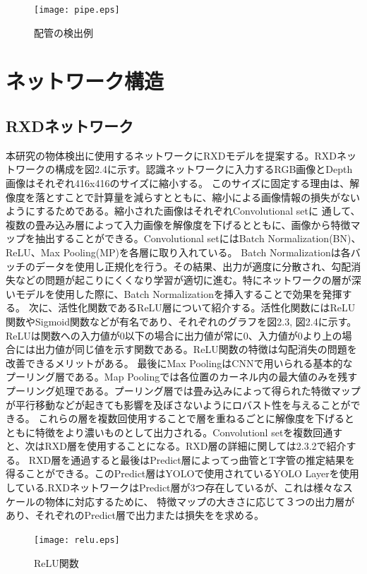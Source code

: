 \begin{figure}[htbt]
	\centering
	 \texttt{[image: pipe.eps]}
	 \caption{配管の検出例}
	 \label{fig:f2}
\end{figure}


\section{ネットワーク構造}
\subsection{RXDネットワーク}

本研究の物体検出に使用するネットワークにRXDモデルを提案する。RXDネットワークの構成を図2.4に示す。認識ネットワークに入力するRGB画像とDepth画像はそれぞれ416x416のサイズに縮小する。
このサイズに固定する理由は、解像度を落とすことで計算量を減らすとともに、縮小による画像情報の損失がないようにするためである。縮小された画像はそれぞれConvolutional setに
通して、複数の畳み込み層によって入力画像を解像度を下げるとともに、画像から特徴マップを抽出することができる。Convolutional setにはBatch Normalization(BN)、ReLU、Max Pooling(MP)を各層に取り入れている。
Batch Normalizationは各バッチのデータを使用し正規化を行う。その結果、出力が適度に分散され、勾配消失などの問題が起こりにくくなり学習が適切に進む。特にネットワークの層が深いモデルを使用した際に、Batch Normalizationを挿入することで効果を発揮する。
次に、活性化関数であるReLU層について紹介する。活性化関数にはReLU関数やSigmoid関数などが有名であり、それぞれのグラフを図2.3, 図2.4に示す。ReLUは関数への入力値が0以下の場合に出力値が常に0、入力値が0より上の場合には出力値が同じ値を示す関数である。ReLU関数の特徴は勾配消失の問題を改善できるメリットがある。
最後にMax PoolingはCNNで用いられる基本的なプーリング層である。Map Poolingでは各位置のカーネル内の最大値のみを残すプーリング処理である。プーリング層では畳み込みによって得られた特徴マップが平行移動などが起きても影響を及ぼさないようにロバスト性を与えることができる。
これらの層を複数回使用することで層を重ねるごとに解像度を下げるとともに特徴をより濃いものとして出力される。Convolutionl setを複数回通すと、次はRXD層を使用することになる。RXD層の詳細に関しては2.3.2で紹介する。
RXD層を通過すると最後はPredict層によってっ曲管とT字管の推定結果を得ることができる。このPredict層はYOLOで使用されているYOLO Layerを使用している.RXDネットワークはPredict層が3つ存在しているが、これは様々なスケールの物体に対応するために、
特徴マップの大きさに応じて３つの出力層があり、それぞれのPredict層で出力または損失をを求める。

\clearpage
\begin{figure}[htbt]
	\centering
	 \texttt{[image: relu.eps]}
	 \caption{ReLU関数}
	 \label{fig:f2}
\end{figure}

